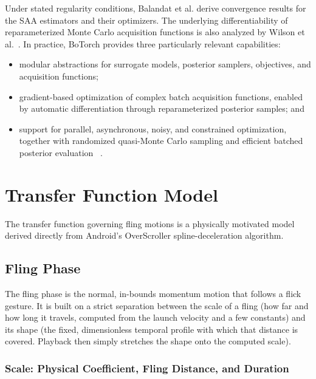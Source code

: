 \documentclass[12pt,a4paper]{report}
\begin{document}
        Under stated regularity conditions, Balandat et al. \cite{balandat2019botorch} derive convergence results for the SAA estimators and their optimizers. The underlying differentiability of reparameterized Monte Carlo acquisition functions is also analyzed by Wilson et al.~\cite{wilson2018maximizing}. In practice, BoTorch provides three particularly relevant capabilities:
        \begin{itemize}
        \item modular abstractions for surrogate models, posterior samplers, objectives,
        and acquisition functions;
        \item gradient-based optimization of complex batch acquisition functions,
        enabled by automatic differentiation through reparameterized posterior
        samples; and
        \item support for parallel, asynchronous, noisy, and constrained optimization,
        together with randomized quasi-Monte Carlo sampling and efficient batched
        posterior evaluation
        ~\cite{balandat2019botorch,wilson2018maximizing}.
        \end{itemize}

        \chapter{Transfer Function Model}

        The transfer function governing fling motions is a physically motivated model derived directly from Android's OverScroller spline-deceleration algorithm.

        \section{Fling Phase}

        The fling phase is the normal, in-bounds momentum motion that follows a flick gesture. It is built on a strict separation between the scale of a fling (how far and how long it travels, computed from the launch velocity and a few constants) and its shape (the fixed, dimensionless temporal profile with which that distance is covered. Playback then simply stretches the shape onto the computed scale).

        \subsection{Scale: Physical Coefficient, Fling Distance, and Duration}
\end{document}
